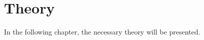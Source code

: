 \chapter{Theory}\label{cha:theory}
In the following chapter, the necessary theory will be presented.
